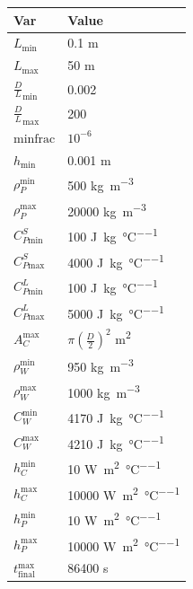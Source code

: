 \documentclass[12pt]{article}
\begin{document}
\begin{table}[!h]
\caption{Specification Parameter Values} \label{TblSpecParams}
\renewcommand{\arraystretch}{1.2}
\noindent \begin{longtable*}{l l} 
  \toprule
  \textbf{Var} & \textbf{Value} \\
  \midrule 
  $L_\text{min}$ & 0.1 \si{\metre}\\
  $L_\text{max}$ & 50 \si{\metre}\\
  ${\frac{D}{L}}_\text{min}$ & 0.002 \\
  ${\frac{D}{L}}_\text{max}$ & 200 \\
  $\text{minfrac} $ & $10^{-6}$\\
  $h_\text{min}$ & 0.001 \si{\metre}\\
  $\rho_P^{\text{min}}$ & 500 \si{\kilo\gram\per\cubic\metre}\\
  $\rho_P^{\text{max}}$ & 20000 \si{\kilo\gram\per\cubic\metre}\\
  $C_{P\text{min}}^S$ & 100 \si{\joule\per\kilo\gram\per\celsius}\\
  $C_{P\text{max}}^S$ & 4000 \si{\joule\per\kilo\gram\per\celsius}\\
  $C_{P\text{min}}^L$ & 100 \si{\joule\per\kilo\gram\per\celsius}\\
  $C_{P\text{max}}^L$ & 5000 \si{\joule\per\kilo\gram\per\celsius}\\
  $A_C^{\text{max}}$ & $\pi(\frac{D}{2})^2$ \si{\square\metre}\\
  $\rho_W^{\text{min}}$ & 950 \si{\kilo\gram\per\cubic\metre}\\
  $\rho_W^{\text{max}}$ & 1000 \si{\kilo\gram\per\cubic\metre}\\
  $C_W^{\text{min}}$ & 4170 \si{\joule\per\kilo\gram\per\celsius}\\
  $C_W^{\text{max}}$ & 4210 \si{\joule\per\kilo\gram\per\celsius}\\
  $h_C^{\text{min}}$ & 10 \si{\watt\per\square\metre\per\celsius}\\
  $h_C^{\text{max}}$ & 10000 \si{\watt\per\square\metre\per\celsius}\\
  $h_P^{\text{min}}$ & 10 \si{\watt\per\square\metre\per\celsius}\\
  $h_P^{\text{max}}$ & 10000 \si{\watt\per\square\metre\per\celsius}\\
  $t_{\text{final}}^{\text{max}}$ & 86400 \si{\second}\\
  
  \bottomrule
\end{longtable*}
\end{table}
\end{document}
